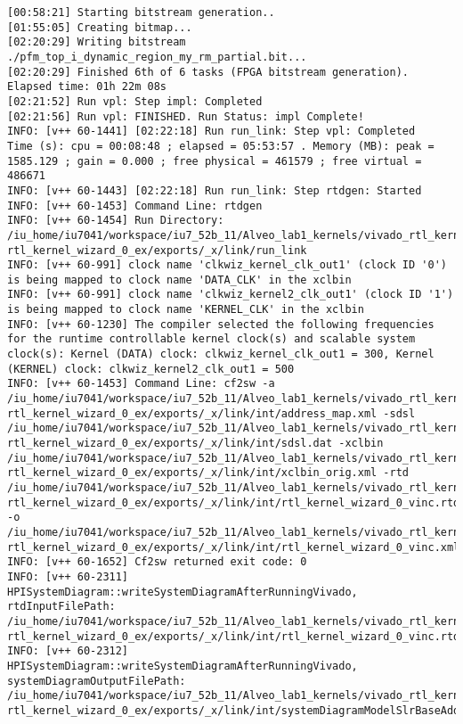 \begin{lstlisting}[label=code:log_file, caption=Содержимое log-файла, basicstyle=\tiny]
[00:58:21] Starting bitstream generation..
[01:55:05] Creating bitmap...
[02:20:29] Writing bitstream ./pfm_top_i_dynamic_region_my_rm_partial.bit...
[02:20:29] Finished 6th of 6 tasks (FPGA bitstream generation). Elapsed time: 01h 22m 08s 
[02:21:52] Run vpl: Step impl: Completed
[02:21:56] Run vpl: FINISHED. Run Status: impl Complete!
INFO: [v++ 60-1441] [02:22:18] Run run_link: Step vpl: Completed
Time (s): cpu = 00:08:48 ; elapsed = 05:53:57 . Memory (MB): peak = 1585.129 ; gain = 0.000 ; free physical = 461579 ; free virtual = 486671
INFO: [v++ 60-1443] [02:22:18] Run run_link: Step rtdgen: Started
INFO: [v++ 60-1453] Command Line: rtdgen
INFO: [v++ 60-1454] Run Directory: /iu_home/iu7041/workspace/iu7_52b_11/Alveo_lab1_kernels/vivado_rtl_kernel/ rtl_kernel_wizard_0_ex/exports/_x/link/run_link
INFO: [v++ 60-991] clock name 'clkwiz_kernel_clk_out1' (clock ID '0') is being mapped to clock name 'DATA_CLK' in the xclbin
INFO: [v++ 60-991] clock name 'clkwiz_kernel2_clk_out1' (clock ID '1') is being mapped to clock name 'KERNEL_CLK' in the xclbin
INFO: [v++ 60-1230] The compiler selected the following frequencies for the runtime controllable kernel clock(s) and scalable system clock(s): Kernel (DATA) clock: clkwiz_kernel_clk_out1 = 300, Kernel (KERNEL) clock: clkwiz_kernel2_clk_out1 = 500
INFO: [v++ 60-1453] Command Line: cf2sw -a /iu_home/iu7041/workspace/iu7_52b_11/Alveo_lab1_kernels/vivado_rtl_kernel/ rtl_kernel_wizard_0_ex/exports/_x/link/int/address_map.xml -sdsl /iu_home/iu7041/workspace/iu7_52b_11/Alveo_lab1_kernels/vivado_rtl_kernel/ rtl_kernel_wizard_0_ex/exports/_x/link/int/sdsl.dat -xclbin /iu_home/iu7041/workspace/iu7_52b_11/Alveo_lab1_kernels/vivado_rtl_kernel/ rtl_kernel_wizard_0_ex/exports/_x/link/int/xclbin_orig.xml -rtd /iu_home/iu7041/workspace/iu7_52b_11/Alveo_lab1_kernels/vivado_rtl_kernel/ rtl_kernel_wizard_0_ex/exports/_x/link/int/rtl_kernel_wizard_0_vinc.rtd -o /iu_home/iu7041/workspace/iu7_52b_11/Alveo_lab1_kernels/vivado_rtl_kernel/ rtl_kernel_wizard_0_ex/exports/_x/link/int/rtl_kernel_wizard_0_vinc.xml
INFO: [v++ 60-1652] Cf2sw returned exit code: 0
INFO: [v++ 60-2311] HPISystemDiagram::writeSystemDiagramAfterRunningVivado, rtdInputFilePath: /iu_home/iu7041/workspace/iu7_52b_11/Alveo_lab1_kernels/vivado_rtl_kernel/ rtl_kernel_wizard_0_ex/exports/_x/link/int/rtl_kernel_wizard_0_vinc.rtd
INFO: [v++ 60-2312] HPISystemDiagram::writeSystemDiagramAfterRunningVivado, systemDiagramOutputFilePath: /iu_home/iu7041/workspace/iu7_52b_11/Alveo_lab1_kernels/vivado_rtl_kernel/ rtl_kernel_wizard_0_ex/exports/_x/link/int/systemDiagramModelSlrBaseAddress.json

\end{lstlisting}
